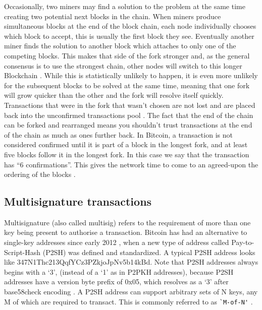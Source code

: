 \documentclass{article}
\begin{document}
Occasionally, two miners may find a solution to the problem at the same time creating two potential next blocks in the chain. When miners produce simultaneous blocks at the end of the block chain, each node individually chooses which block to accept, this is usually the first block they see. Eventually another miner finds the solution to another block which attaches to only one of the competing blocks. This makes that side of the fork stronger and, as the general consensus is to use the strongest chain, other nodes will switch to this longer Blockchain \citep{20_developer_guide_bitcoin_2016}. While this is statistically unlikely to happen, it is even more unlikely for the subsequent blocks to be solved at the same time, meaning that one fork will grow quicker than the other and the fork will resolve itself quickly. Transactions that were in the fork that wasn't chosen are not lost and are placed back into the unconfirmed transactions pool \citep{4_driscoll_2016}. The fact that the end of the chain can be forked and rearranged means you shouldn't trust transactions at the end of the chain as much as ones further back. In Bitcoin, a transaction is not considered confirmed until it is part of a block in the longest fork, and at least five blocks follow it in the longest fork. In this case we say that the transaction has ``6 confirmations''. This gives the network time to come to an agreed-upon the ordering of the blocks \citep{35_nielsen_2013}.


    \subsection{Multisignature transactions}
    
    Multisignature (also called multisig) refers to the requirement of more than one key being present to authorise a transaction. Bitcoin has had an alternative to single-key addresses since early 2012 \citep{36_multisignature_bitcoin_wiki_2016}, when a new type of address called Pay-to-Script-Hash (P2SH) was defined and standardized. A typical P2SH address looks like 347N1Thc213QqfYCz3PZkjoJpNv5b14kBd. Note that P2SH addresses always begins with a `3', (instead of a `1' as in P2PKH addresses), because P2SH addresses have a version byte prefix of 0x05, which resolves as a `3' after base58check encoding \citep{39_pour_2014}. A P2SH address can support arbitrary sets of N keys, any M of which are required to transact. This is commonly referred to as \verb|`M-­of-­N'| \citep{37_davenport_2015}.
\end{document}
